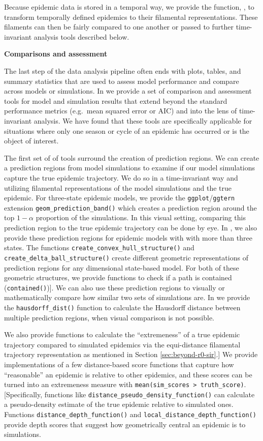 \documentclass[
  shortnames]{jss}
\begin{document}
Because epidemic data is stored in a temporal way, we provide the
function, , to transform temporally defined
epidemics to their filamental representations. These filaments can then
be fairly compared to one another or passed to further time-invariant
analysis tools described below.

\textbf{Comparisons and assessment}

The last step of the data analysis pipeline often ends with plots,
tables, and summary statistics that are used to assess model performance
and compare across models or simulations. In  we provide
a set of comparison and assessment tools for model and simulation
results that extend beyond the standard performance metrics (e.g.~mean
squared error or AIC) and into the lens of time-invariant analysis. We
have found that these tools are specifically applicable for situations
where only one season or cycle of an epidemic has occurred or is the
object of interest.

The first set of of tools surround the creation of prediction regions.
We can create a prediction regions from model simulations to examine if
our model simulations capture the true epidemic trajectory. We do so in
a time-invariant way and utilizing filamental representations of the
model simulations and the true epidemic. For three-state epidemic
models, we provide the \texttt{ggplot}/\texttt{ggtern} extension
\texttt{geom\_prediction\_band()} which creates a prediction region
around the top \(1-\alpha\) proportion of the simulations. In this
visual setting, comparing this prediction region to the true epidemic
trajectory can be done by eye. In , we also provide
these prediction regions for epidemic models with with more than three
states. The functions \texttt{create\_convex\_hull\_structure()} and
\texttt{create\_delta\_ball\_structure()} create different geometric
representations of prediction regions for any dimensional state-based
model. For both of these geometric structures, we provide functions to
check if a path is contained (\texttt{contained()}){]}. We can also use
these prediction regions to visually or mathematically compare how
similar two sets of simulations are. In  we provide the
\texttt{hausdorff\_dist()} function to calculate the Hausdorff distance
between multiple prediction regions, when visual comparison is not
possible.

We also provide functions to calculate the ``extremeness'' of a true
epidemic trajectory compared to simulated epidemics via the
equi-distance filamental trajectory representation as mentioned in
Section \ref{sec:beyond-r0-sir}.{]} We provide implementations of a few
distance-based score functions that capture how ``reasonable'' an
epidemic is relative to other epidemics, and these scores can be turned
into an extremeness measure with
\texttt{mean(sim\_scores\ \textgreater{}\ truth\_score)}.
{[}Specifically, functions like
\texttt{distance\_pseudo\_density\_function()} can calculate a
pseudo-density estimate of the true epidemic relative to simulated ones.
Functions \texttt{distance\_depth\_function()} and
\texttt{local\_distance\_depth\_function()} provide depth scores that
suggest how geometrically central an epidemic is to simulations.
\end{document}
